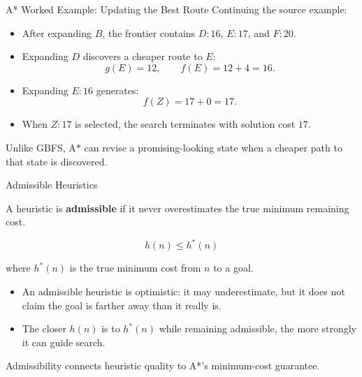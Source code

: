 \documentclass[aspectratio=169,10pt]{beamer}
\begin{document}
\begin{frame}[shrink=20]{A* Worked Example: Updating the Best Route}
  Continuing the source example:

  \begin{itemize}
    \item After expanding $B$, the frontier contains $D:16$, $E:17$, and $F:20$.
    \item Expanding $D$ discovers a cheaper route to $E$:
      \[
        g(E)=12,\qquad f(E)=12+4=16.
      \]
    \item Expanding $E:16$ generates:
      \[
        f(Z)=17+0=17.
      \]
    \item When $Z:17$ is selected, the search terminates with solution cost $17$.
  \end{itemize}

  \begin{keyidea}
    Unlike GBFS, A* can revise a promising-looking state when a cheaper path to that state is discovered.
  \end{keyidea}
\end{frame}

\begin{frame}[shrink=20]{Admissible Heuristics}
  \begin{cpdefinition}
    A heuristic is \textbf{admissible} if it never overestimates the true minimum remaining cost.
  \end{cpdefinition}

  \[
    h(n)\le h^*(n)
  \]

  where $h^*(n)$ is the true minimum cost from $n$ to a goal.

  \begin{itemize}
    \item An admissible heuristic is optimistic: it may underestimate, but it does not claim the goal is farther away than it really is.
    \item The closer $h(n)$ is to $h^*(n)$ while remaining admissible, the more strongly it can guide search.
  \end{itemize}

  \begin{keyidea}
    Admissibility connects heuristic quality to A*'s minimum-cost guarantee.
  \end{keyidea}
\end{frame}
\end{document}
